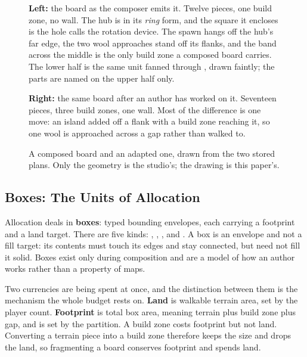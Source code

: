 \begin{figure}[htbp]
\centering
\begin{minipage}[b]{0.56\textwidth}\raggedright
  
\end{minipage}%
\hfill
\begin{minipage}[b]{0.40\textwidth}\raggedleft
  
\end{minipage}

\medskip
\planlegend

\medskip
{\small
\begin{minipage}{0.96\textwidth}
\textbf{Left:} the board as the composer emits it. Twelve pieces, one build zone,
no wall. The hub is in its \emph{ring} form, and the square it encloses is the hole
 calls the rotation device. The spawn hangs off the hub's far edge, the two
wool approaches stand off its flanks, and the band across the middle is the only
build zone a composed board carries. The lower half is the same unit fanned through
, drawn faintly; the parts are named on the upper half only.

\smallskip
\textbf{Right:} the same board after an author has worked on it. Seventeen pieces,
three build zones, one wall. Most of the difference is one move: an island added
off a flank with a build zone reaching it, so one wool is approached across a gap
rather than walked to.
\end{minipage}}
\caption{A composed board and an adapted one, drawn from the two stored plans.
Only the geometry is the studio's; the drawing is this paper's.}
\label{fig:composed-card}
\end{figure}

\subsection{Boxes: The Units of Allocation}

Allocation deals in \textbf{boxes}: typed bounding envelopes, each carrying a
footprint and a land target. There are five kinds: , ,
,  and . A box is an envelope and not a fill
target:
its contents must touch its edges and stay connected, but need not fill it solid.
Boxes exist only during composition and are a model of how an author works rather
than a property of maps.

Two currencies are being spent at once, and the distinction between them is the
mechanism the whole budget rests on. \textbf{Land} is walkable terrain area, set
by the player count. \textbf{Footprint} is total box area, meaning terrain plus
build zone plus gap, and is set by the partition. A build zone costs footprint but
not land.
Converting a terrain piece into a build zone therefore keeps the size and drops
the land, so fragmenting a board conserves footprint and spends land.

